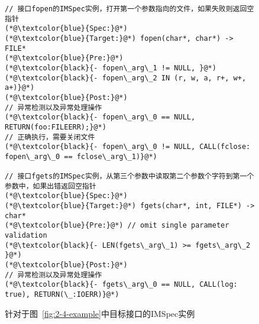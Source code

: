 \begin{figure}[!b]
	\centering
	\begin{lstlisting}
// 接口fopen的IMSpec实例，打开第一个参数指向的文件，如果失败则返回空指针
(*@\textcolor{blue}{Spec:}@*)
(*@\textcolor{blue}{Target:}@*) fopen(char*, char*) -> FILE*
(*@\textcolor{blue}{Pre:}@*) 
(*@\textcolor{black}{- fopen\_arg\_1 != NULL, }@*)
(*@\textcolor{black}{- fopen\_arg\_2 IN (r, w, a, r+, w+, a+)}@*)
(*@\textcolor{blue}{Post:}@*) 
// 异常检测以及异常处理操作
(*@\textcolor{black}{- fopen\_arg\_0 == NULL, RETURN(foo:FILEERR);}@*)
// 正确执行，需要关闭文件
(*@\textcolor{black}{- fopen\_arg\_0 != NULL, CALL(fclose: fopen\_arg\_0 == fclose\_arg\_1)}@*)

// 接口fgets的IMSpec实例，从第三个参数中读取第二个参数个字符到第一个参数中，如果出错返回空指针
(*@\textcolor{blue}{Spec:}@*)
(*@\textcolor{blue}{Target:}@*) fgets(char*, int, FILE*) -> char*
(*@\textcolor{blue}{Pre:}@*) // omit single parameter validation
(*@\textcolor{black}{- LEN(fgets\_arg\_1) >= fgets\_arg\_2 }@*)
(*@\textcolor{blue}{Post:}@*)
// 异常检测以及异常处理操作 
(*@\textcolor{black}{- fgets\_arg\_0 == NULL, CALL(log: true), RETURN(\_:IOERR)}@*)
	\end{lstlisting}
	\caption{
		针对于图~\ref{fig:2-4-example}中目标接口的IMSpec实例
	}
	\label{fig:2-4-example-imspec}
\end{figure}